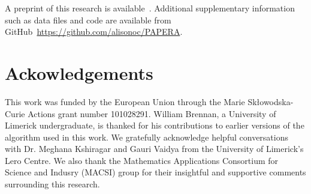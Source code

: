 \documentclass[preprint, review, 12pt]{elsarticle}
\begin{document}
	A preprint of this research is available~\cite{OCONNOR2023}. Additional supplementary information such as data files and code are available from GitHub~\url{https://github.com/alisonoc/PAPERA}.


	\section{Ackowledgements}
	\label{h:acknowledgements}

	This work was funded by the European Union through the Marie Sk{\l}owodska-Curie Actions grant number 101028291.
	William Brennan, a University of Limerick undergraduate, is thanked for his contributions to earlier versions of the algorithm used in this work.
	We gratefully acknowledge helpful conversations with Dr. Meghana Kshiragar and Gauri Vaidya from the University of Limerick's Lero Centre.
	We also thank the Mathematics Applications Consortium for Science and Indusry (MACSI) group for their insightful and supportive comments surrounding this research.

%


\end{document}
